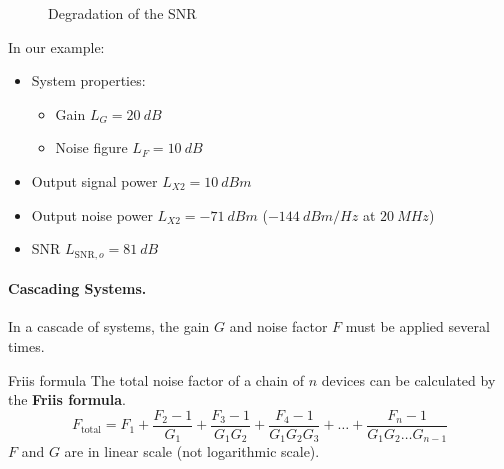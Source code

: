 \begin{refsection}
\begin{figure}[H]
	\caption[Degradation of the SNR]{Degradation of the \ac{SNR}}
\end{figure}

In our example:
\begin{itemize}
	\item System properties:
	\begin{itemize}
		\item Gain $L_G = \SI{20}{dB}$
		\item Noise figure $L_F = \SI{10}{dB}$
	\end{itemize}
	\item Output signal power $L_{X2} = \SI{+10}{dBm}$
	\item Output noise power $L_{X2} = \SI{-71}{dBm}$ ($\SI{-144}{dBm/Hz}$ at $\SI{20}{MHz}$)
	\item \ac{SNR} $L_{\mathrm{SNR},o} = \SI{81}{dB}$
\end{itemize}

\paragraph{Cascading Systems.}

In a cascade of systems, the gain $G$ and noise factor $F$ must be applied several times.

\begin{definition}{Friis formula}
	The total noise factor of a chain of $n$ devices can be calculated by the  \textbf{Friis formula}.
	\begin{equation}
		F_{\text{total}} = F_1 + \frac{F_2 - 1}{G_1} + \frac{F_3 - 1}{G_1 G_2} + \frac{F_4 - 1}{G_1 G_2 G_3} + \dots + \frac{F_n - 1}{G_1 G_2 \dots G_{n-1}}
	\end{equation}
	$F$ and $G$ are in linear scale (not logarithmic scale).
	

\end{definition}
\end{refsection}
